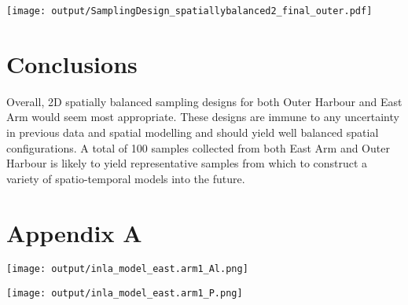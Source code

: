 \documentclass[a4paper]{article}
\let\origfigure=\figure
\let\endorigfigure=\endfigure
\renewenvironment{figure}[1][]{%
   \origfigure[H]
}{%
   \endorigfigure
}
\begin{document}
\begin{figure}
\centering\scriptsize
\texttt{[image: output/SamplingDesign\_spatiallybalanced2\_final\_outer.pdf]}
\caption{Two dimensional spatially balanced sampling configuration for
the Outer Harbour (100
samples)\label{fig:SamplingDesign_spatiallybalanced2_final_outer}}
\end{figure}

\hypertarget{conclusions-1}{%
\section{Conclusions}\label{conclusions-1}}

Overall, 2D spatially balanced sampling designs for both Outer Harbour
and East Arm would seem most appropriate. These designs are immune to
any uncertainty in previous data and spatial modelling and should yield
well balanced spatial configurations. A total of 100 samples collected
from both East Arm and Outer Harbour is likely to yield representative
samples from which to construct a variety of spatio-temporal models into
the future.

\hypertarget{appendix-a-1}{%
\section{Appendix A}\label{appendix-a-1}}

\begin{figure}
\centering\scriptsize
\texttt{[image: output/inla\_model\_east.arm1\_Al.png]}
\caption{Integrated Nested Laplace Approximation (INLA) barrier spatial
modelling of Aluminium. The diagram illustrates a) the mesh, b) the
barrier mask, c) the resulting predicted 2D surface (and observed
training data as points) and d) the resulting predicted 2D surface
scaled to the range of predictions.\label{fig:inla_model_east.arm_Al}}
\end{figure}

\begin{figure}
\centering\scriptsize
\texttt{[image: output/inla\_model\_east.arm1\_P.png]}
\caption{Integrated Nested Laplace Approximation (INLA) barrier spatial
modelling of Phosphorus. The diagram illustrates a) the mesh, b) the
barrier mask, c) the resulting predicted 2D surface (and observed
training data as points) and d) the resulting predicted 2D surface
scaled to the range of predictions.\label{fig:inla_model_east.arm_P}}
\end{figure}
\end{document}
